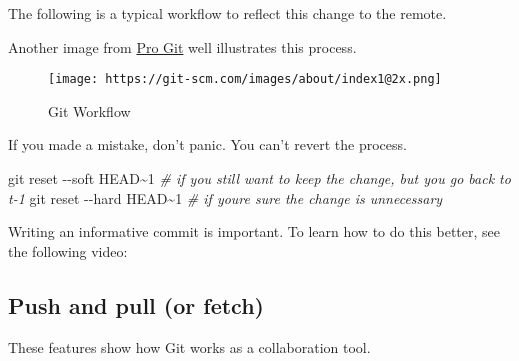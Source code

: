 \documentclass[
]{book}
\newenvironment{Shaded}{\begin{snugshade}}{\end{snugshade}}
\newcommand{\AttributeTok}[1]{\textcolor[rgb]{0.77,0.63,0.00}{#1}}
\newcommand{\CommentTok}[1]{\textcolor[rgb]{0.56,0.35,0.01}{\textit{#1}}}
\newcommand{\ExtensionTok}[1]{#1}
\newcommand{\FunctionTok}[1]{\textcolor[rgb]{0.00,0.00,0.00}{#1}}
\newcommand{\NormalTok}[1]{#1}
\newcommand{\StringTok}[1]{\textcolor[rgb]{0.31,0.60,0.02}{#1}}
\begin{document}
The following is a typical workflow to reflect this change to the remote.

\begin{Shaded}
\end{Shaded}

Another image from \href{https://git-scm.com/about/staging-area}{Pro Git} well illustrates this process.

\begin{figure}
\centering
\texttt{[image: https://git-scm.com/images/about/index1@2x.png]}
\caption{Git Workflow}
\end{figure}

If you made a mistake, don't panic. You can't revert the process.

\begin{Shaded}
\begin{Highlighting}[]
\FunctionTok{git}\NormalTok{ reset }\AttributeTok{{-}{-}soft}\NormalTok{ HEAD\textasciitilde{}1 }\CommentTok{\# if you still want to keep the change, but you go back to t{-}1 }
\FunctionTok{git}\NormalTok{ reset }\AttributeTok{{-}{-}hard}\NormalTok{ HEAD\textasciitilde{}1 }\CommentTok{\# if you\textquotesingle{}re sure the change is unnecessary }
\end{Highlighting}
\end{Shaded}

Writing an informative commit is important. To learn how to do this better, see the following video:

\hypertarget{push-and-pull-or-fetch}{%
\subsection{Push and pull (or fetch)}\label{push-and-pull-or-fetch}}

These features show how Git works as a collaboration tool.
\end{document}
